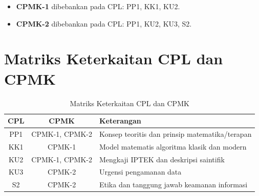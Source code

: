 \documentclass[main.tex]{subfiles}
\begin{document}
\begin{itemize}
  \item \textbf{CPMK-1} dibebankan pada CPL: PP1, KK1, KU2.
  \item \textbf{CPMK-2} dibebankan pada CPL: PP1, KU2, KU3, S2.
\end{itemize}

\section*{Matriks Keterkaitan CPL dan CPMK}

\begin{table}[htbp]
\centering
\small
\begin{tabular}{|c|c|>{\raggedright\arraybackslash}p{6cm}|}
  \hline
  \textbf{CPL} & \textbf{CPMK} & \textbf{Keterangan} \\
  \hline
  PP1 & CPMK-1, CPMK-2 & Konsep teoritis dan prinsip matematika/terapan \\
  \hline
  KK1 & CPMK-1 & Model matematis algoritma klasik dan modern \\
  \hline
  KU2 & CPMK-1, CPMK-2 & Mengkaji IPTEK dan deskripsi saintifik \\
  \hline
  KU3 & CPMK-2 & Urgensi pengamanan data \\
  \hline
  S2 & CPMK-2 & Etika dan tanggung jawab keamanan informasi \\
  \hline
\end{tabular}
\caption{Matriks Keterkaitan CPL dan CPMK}
\end{table}

\cleardoublepage

{}
\tableofcontents
\cleardoublepage

\clearpage
{}
{}
\sloppy
\listoffigures
\fussy
\cleardoublepage

{}
\listoftables
\cleardoublepage

{}
\lstlistoflistings
\cleardoublepage
\end{document}
